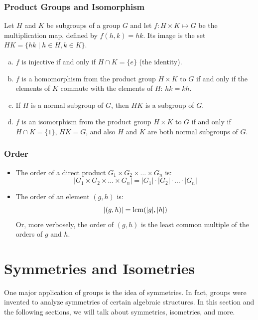 \documentclass[letterpaper]{article}
\begin{document}
\subsubsection{Product Groups and Isomorphism}
\begin{mdframed}
    \begin{proposition}
        Let $H$ and $K$ be subgroups of a group $G$ and let $f: H \times K \mapsto G$ be the multiplication map, defined by $f(h, k) = hk$. Its image is the set $HK = \{hk \mid h \in H, k \in K\}$. 
        \begin{enumerate}[(a)]
            \item $f$ is injective if and only if $H \cap K = \{e\}$ (the identity). 
            \item $f$ is a homomorphism from the product group $H \times K$ to $G$ if and only if the elements of $K$ commute with the elements of $H$: $hk = kh$. 
            \item If $H$ is a normal subgroup of $G$, then $HK$ is a subgroup of $G$. 
            \item $f$ is an isomorphism from the product group $H \times K$ to $G$ if and only if $H \cap K = \{1\}$, $HK = G$, and also $H$ and $K$ are both normal subgroups of $G$. 
        \end{enumerate}
    \end{proposition}
\end{mdframed}

\subsubsection{Order}
\begin{itemize}
    \item The order of a direct product $G_1 \times G_2 \times \dots \times G_n$ is: 
    \[|G_1 \times G_2 \times \dots \times G_n| = |G_1| \cdot |G_2| \cdot \ldots \cdot |G_n|\]
    \item The order of an element $(g, h)$ is: 
    \[|(g, h)| = \operatorname{lcm}(|g|, |h|)\]
    Or, more verbosely, the order of $(g, h)$ is the least common multiple of the orders of $g$ and $h$. 
\end{itemize}









\newpage 
\section{Symmetries and Isometries}
One major application of groups is the idea of symmetries. In fact, groups were invented to analyze symmetries of certain algebraic structures. In this section and the following sections, we will talk about symmetries, isometries, and more. 
\end{document}
